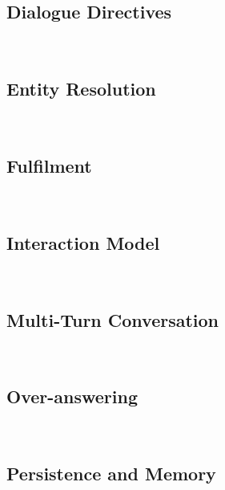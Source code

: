 	

	\subsection*{Dialogue Directives}~\label{directives:def}
	
	\subsection*{Entity Resolution}~\label{entityRes:def}	
	
	\subsection*{Fulfilment}~\label{fulfillment:def}
	
	\subsection*{Interaction Model}~\label{interactionMdl:def}
	
	\subsection*{Multi-Turn Conversation}~\label{multiturn:def}
	
	\subsection*{Over-answering}~\label{entityRes:def}

	\subsection*{Persistence and Memory}~\label{entityRes:def}

%	










